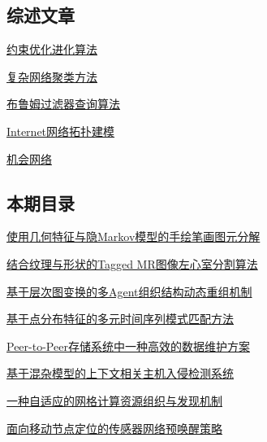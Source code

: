 \documentclass[a4paper]{article}
\begin{document}
\subsection{综述文章}
\href{http://www.jos.org.cn/ch/reader/download_pdf.aspx?file_no=3363&year_id=2009&quarter_id=1&falg=1}{约束优化进化算法}

\href{http://www.jos.org.cn/ch/reader/download_pdf.aspx?file_no=3464&year_id=2009&quarter_id=1&falg=1}{复杂网络聚类方法}

\href{http://www.jos.org.cn/ch/reader/download_pdf.aspx?file_no=3458&year_id=2009&quarter_id=1&falg=1}{布鲁姆过滤器查询算法}

\href{http://www.jos.org.cn/ch/reader/download_pdf.aspx?file_no=3390&year_id=2009&quarter_id=1&falg=1}{Internet网络拓扑建模}

\href{http://www.jos.org.cn/ch/reader/download_pdf.aspx?file_no=3467&year_id=2009&quarter_id=1&falg=1}{机会网络}

\subsection{本期目录}
\href{http://www.jos.org.cn/ch/reader/download_pdf.aspx?file_no=3383&year_id=2009&quarter_id=1&falg=1}{使用几何特征与隐Markov模型的手绘笔画图元分解}

\href{http://www.jos.org.cn/ch/reader/download_pdf.aspx?file_no=3360&year_id=2009&quarter_id=1&falg=1}{结合纹理与形状的Tagged MR图像左心室分割算法}

\href{http://www.jos.org.cn/ch/reader/download_pdf.aspx?file_no=3334&year_id=2009&quarter_id=1&falg=1}{基于层次图变换的多Agent组织结构动态重组机制}

\href{http://www.jos.org.cn/ch/reader/download_pdf.aspx?file_no=3450&year_id=2009&quarter_id=1&falg=1}{基于点分布特征的多元时间序列模式匹配方法}

\href{http://www.jos.org.cn/ch/reader/download_pdf.aspx?file_no=3382&year_id=2009&quarter_id=1&falg=1}{Peer-to-Peer存储系统中一种高效的数据维护方案}

\href{http://www.jos.org.cn/ch/reader/download_pdf.aspx?file_no=3165&year_id=2009&quarter_id=1&falg=1}{基于混杂模型的上下文相关主机入侵检测系统}

\href{http://www.jos.org.cn/ch/reader/download_pdf.aspx?file_no=3167&year_id=2009&quarter_id=1&falg=1}{一种自适应的网格计算资源组织与发现机制}

\href{http://www.jos.org.cn/ch/reader/download_pdf.aspx?file_no=562&year_id=2009&quarter_id=1&falg=1}{面向移动节点定位的传感器网络预唤醒策略}
\end{document}
